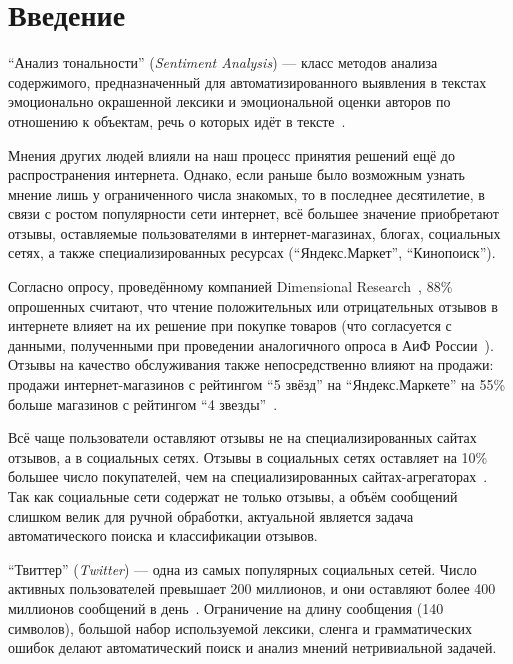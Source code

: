 \section*{Введение}

``Анализ тональности'' (\textit{Sentiment Analysis}) ---  класс методов анализа 
содержимого, предназначенный для автоматизированного выявления в текстах 
эмоционально окрашенной лексики и эмоциональной оценки авторов по 
отношению  к объектам, речь о которых идёт в тексте~\cite{wikisent}. 

Мнения других людей влияли на наш процесс принятия решений ещё до 
распространения интернета. Однако, если раньше было возможным узнать мнение 
лишь у ограниченного числа знакомых, то в последнее десятилетие, в связи с 
ростом популярности сети интернет, всё большее значение приобретают отзывы, 
оставляемые пользователями в интернет-магазинах, блогах, социальных сетях, а 
также специализированных ресурсах (``Яндекс.Маркет'', ``Кинопоиск''). 

Согласно опросу, проведённому компанией Dimensional Research~\cite{dimresearch}, 88\% опрошенных считают, что чтение положительных или отрицательных 
отзывов в интернете влияет на их решение при покупке товаров (что согласуется с 
данными, полученными при проведении аналогичного опроса в АиФ России~\cite{aif}). 
Отзывы на качество обслуживания также непосредственно влияют на продажи: 
продажи интернет-магазинов с рейтингом ``5 звёзд'' на ``Яндекс.Маркете'' на 55\% 
больше магазинов с рейтингом ``4 звезды''~\cite{medianation}.

Всё чаще пользователи оставляют отзывы не на специализированных 
сайтах отзывов, а в социальных сетях. 
Отзывы в социальных сетях оставляет на 10\% большее число покупателей, чем на 
специализированных сайтах-агрегаторах~\cite{dimresearch}.
Так как социальные сети содержат не только отзывы, а объём сообщений слишком 
велик для ручной обработки, актуальной является задача автоматического поиска 
и классификации отзывов.
 
``Твиттер'' (\textit{Twitter}) --- одна из самых популярных социальных сетей. 
Число активных пользователей превышает 200 миллионов, и они оставляют более 
400 миллионов сообщений в день~\cite{twitter_users}. 
Ограничение на длину сообщения (140 символов), большой набор используемой 
лексики, сленга и грамматических ошибок делают автоматический поиск и анализ
мнений нетривиальной задачей.

